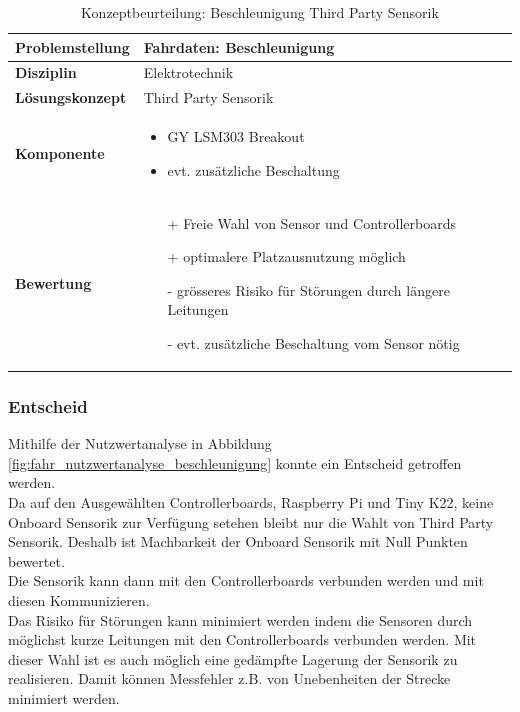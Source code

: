 \documentclass[../../main.tex]{subfiles}
\begin{document}
    \begin{flushleft}
        \begin{table}[H]
        \begin{tabular}{ | l | p{11cm} |}
        \hline
        \textbf{Problemstellung} & Fahrdaten: Beschleunigung \\ \hline
        \textbf{Disziplin} & Elektrotechnik \\ \hline
        \textbf{Lösungskonzept} & Third Party Sensorik\\ \hline
        \textbf{Komponente} & \begin{itemize}
            \item GY LSM303 Breakout
            \item evt. zusätzliche Beschaltung
            \end{itemize}\\ \hline
        \textbf{Bewertung} &  \begin{itemize}
                                \item[+] Freie Wahl von Sensor und Controllerboards
                                \item[+] optimalere Platzausnutzung möglich 
                                \item[-] grösseres Risiko für Störungen durch längere Leitungen
                                \item[-] evt. zusätzliche Beschaltung vom Sensor nötig 
                              \end{itemize} \\ \hline
        \end{tabular}
        \caption{Konzeptbeurteilung: Beschleunigung Third Party Sensorik}
        \label{tab:fahr_Third_Party_Sensorik}
    \end{table}
    \end{flushleft}

    \subsubsection{Entscheid}
    Mithilfe der Nutzwertanalyse in Abbildung \ref{fig:fahr_nutzwertanalyse_beschleunigung} konnte ein Entscheid getroffen werden.\\
    Da auf den Ausgewählten Controllerboards, Raspberry Pi und Tiny K22, keine Onboard Sensorik zur Verfügung setehen bleibt nur die Wahlt von Third Party Sensorik. Deshalb ist Machbarkeit der Onboard Sensorik mit Null Punkten bewertet.\\
    Die Sensorik kann dann mit den Controllerboards verbunden werden und mit diesen Kommunizieren.\\
    Das Risiko für Störungen kann minimiert werden indem die Sensoren durch möglichst kurze Leitungen mit den Controllerboards verbunden werden. Mit dieser Wahl ist es auch möglich eine gedämpfte Lagerung der Sensorik zu realisieren. Damit können Messfehler z.B. von Unebenheiten der Strecke minimiert werden.  
        
\end{document}
